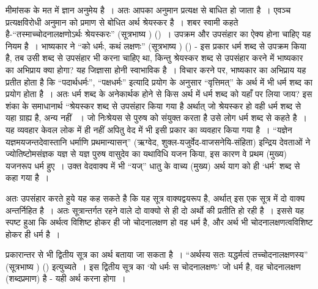 मीमांसक के मत में ज्ञान अनुमेय है~। अतः आपका अनुमान प्रत्यक्ष से बाधित हो जाता है~। एवञ्च प्रत्यक्षविरोधी अनुमान को प्रमाण से बोधित अर्थ श्रेयस्कर है~। शबर स्वामी कहते है-“तस्माच्चोदनालक्षणोऽर्थः श्रेयस्करः” (सूत्रभाष्य ) ()~। उपक्रम और उपसंहार का ऐक्य होना चाहिए यह नियम है~। भाष्यकार ने “को धर्मः, कथं लक्षणः” (सूत्रभाष्य ) () - इस प्रकार धर्म शब्द से उपक्रम किया है, तब उसी शब्द से उपसंहार भी करना चाहिए था, किन्तु श्रेयस्कर शब्द से उपसंहार करने में भाष्यकार का अभिप्राय क्या होगा? यह जिज्ञासा होनी स्वाभाविक है~। विचार करने पर, भाष्यकार का अभिप्राय यह प्रतीत होता है कि “पदार्थधर्मः”, “पक्षधर्मः” इत्यादि प्रयोग के अनुसार “वृत्तिमत्” के अर्थ में भी धर्म शब्द का प्रयोग होता है~। अतः धर्म शब्द के अनेकार्थक होने से किस अर्थ में धर्म शब्द को यहाँ पर लिया जाय? इस शंका के समाधानार्थ “श्रेयस्कर शब्द से उपसंहार किया गया है अर्थात् जो श्रेयस्कर हो वही धर्म शब्द से यहा ग्राह्य है, अन्य नहीं ~। जो निःश्रेयस से पुरुष को संयुक्त करता है उसे लोग धर्म शब्द से कहते है~। यह व्यवहार केवल लोक में ही नहीं अपितु वेद में भी इसी प्रकार का व्यवहार किया गया है~। “यज्ञेन यज्ञमयजन्तदेवास्तानि धर्माणि प्रथमान्यासन्” (ऋग्वेद, शुक्ल-यजुर्वेद-वाजसनेयि-संहिता) इन्द्रिय देवताओं ने ज्योतिष्टोमसंज्ञक यज्ञ से यज्ञ पुरुष वासुदेव का यथाविधि यजन किया, इस कारण वे प्रथम (मुख्य) यजनरूप धर्म हुए~। उक्त वेदवाक्य में भी “यज्” धातु के वाच्य (मुख्य) अर्थ याग को ही ‘धर्म' शब्द से कहा गया है~।

अतः उपसंहार करते हुये यह कह सकते है कि यह सूत्र वाक्यद्वयरूप है, अर्थात् इस एक सूत्र में दो वाक्य अन्तर्निहित है~। अतः सूत्रान्तर्गत रहने वाले दो वाक्यो से ही दो अर्थो की प्रतीति हो रही है~। इससे यह स्पष्ट हुआ कि अर्थत्व विशिष्ट होकर ही जो चोदनालक्षण हो वह धर्म है, और अर्थ भी चोदनालक्षणत्वविशिष्ट होकर ही धर्म है~।

प्रकारान्तर से भी द्वितीय सूत्र का अर्थ बताया जा सकता है~। “अर्थस्य सतः यद्धर्मत्वं तच्चोदनालक्षणस्य” (सूत्रभाष्य ) () इत्युच्यते~। इस द्वितीय सूत्र का ‘यो धर्मः स चोदनालक्षणः' जो धर्म है, वह चोदनालक्षण (शब्दप्रमाण) है - यही अर्थ करना होगा~।\\[-.7cm]

